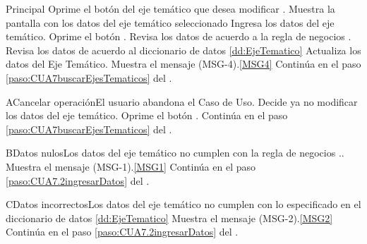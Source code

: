 	\begin{UCtrayectoria}{Principal}
			\UCpaso[\UCactor] Oprime el botón  del eje temático que desea modificar 
			.
			\UCpaso Muestra la pantalla  con los datos del eje temático seleccionado 
			\UCpaso [\UCactor] Ingresa los datos del eje temático.\label{paso:CUA7.2ingresarDatos}
			\UCpaso [\UCactor] Oprime el botón .
			\UCpaso Revisa los datos de acuerdo a la regla de negocios . 
			\UCpaso	Revisa los datos de acuerdo al diccionario de datos \ref{dd:EjeTematico} 
			\UCpaso Actualiza los datos del Eje Temático.
			\UCpaso Muestra el mensaje (MSG-4).\ref{MSG4}
			\UCpaso Continúa en el paso \ref{paso:CUA7buscarEjesTematicos} del .
	\end{UCtrayectoria}
	\newpage
		\begin{UCtrayectoriaA}{A}{Cancelar operación}{El usuario abandona el Caso de Uso.}
			\UCpaso[\UCactor] Decide ya no modificar los datos del eje temático.
			\UCpaso[\UCactor] Oprime el botón .
			\UCpaso Continúa en el paso \ref{paso:CUA7buscarEjesTematicos} del .
		\end{UCtrayectoriaA}
		
		 \begin{UCtrayectoriaA}{B}{Datos nulos}{Los datos del eje temático no cumplen con la regla de negocios ..}
			\UCpaso Muestra el mensaje (MSG-1).\ref{MSG1}
			\UCpaso Continúa en el paso \ref{paso:CUA7.2ingresarDatos} del .
		\end{UCtrayectoriaA}

		 \begin{UCtrayectoriaA}{C}{Datos incorrectos}{Los datos del eje temático no cumplen con lo especificado en el diccionario de datos \ref{dd:EjeTematico}}
			\UCpaso Muestra el mensaje (MSG-2).\ref{MSG2}
			\UCpaso Continúa en el paso \ref{paso:CUA7.2ingresarDatos} del .
		\end{UCtrayectoriaA}


